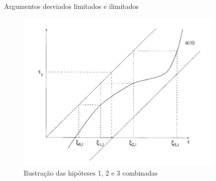 \documentclass{beamer}
\theoremstyle{plain}
\theoremstyle{definition}
\begin{document}
\begin{frame}{Argumentos desviados limitados e ilimitados}

    \begin{figure}
        \begin{center}
            \includegraphics[width=0.9\textwidth, height=0.7\textheight]{hip123.png}
        \end{center}
        \caption{Ilustração das hipóteses 1, 2 e 3 combinadas}\label{fig:hip123}
    \end{figure}

\end{frame}


\end{document}
